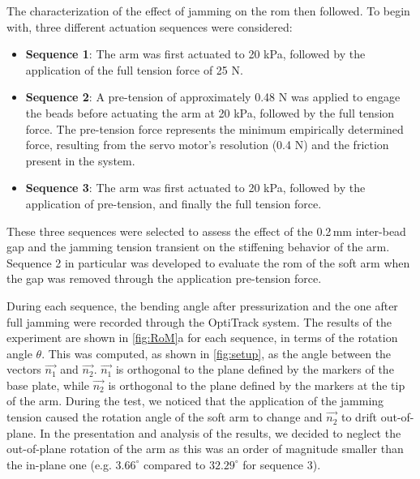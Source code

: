 The characterization of the effect of jamming on the \gls{rom} then followed.
To begin with, three different actuation sequences were considered:  
\begin{itemize}
    \item \textbf{Sequence 1}: The arm was first actuated to 20 kPa, followed by the application of the full tension force of 25 N. 
    \item \textbf{Sequence 2}: A pre-tension of approximately 0.48 N was applied to engage the beads before actuating the arm at 20 kPa, followed by the full tension force. 
    The pre-tension force represents the minimum empirically determined force, resulting from the servo motor’s resolution (0.4 N) and the friction present in the system.
    \item \textbf{Sequence 3}: The arm was first actuated to 20 kPa, followed by the application of pre-tension, and finally the full tension force.
\end{itemize}
These three sequences were selected to assess the effect of the 0.2\,mm inter-bead gap and the jamming tension transient on the stiffening behavior of the arm. Sequence 2 in particular was developed to evaluate the \gls{rom} of the soft arm when the gap was removed through the application pre-tension force.

During each sequence, the bending angle after pressurization and the one after full jamming were recorded through the OptiTrack system. The results of the experiment are shown in \cref{fig:RoM}a for each sequence, in terms of the rotation angle $\theta$. This was computed, as shown in \cref{fig:setup}, as the angle between the vectors $\overrightarrow{n_1}$ and $\overrightarrow{n_2}$. $\overrightarrow{n_1}$ is orthogonal to the plane defined by the markers of the base plate, while $\overrightarrow{n_2}$ is orthogonal to the plane defined by the markers at the tip of the arm. During the test, we noticed that the application of the jamming tension caused the rotation angle of the soft arm to change and $\overrightarrow{n_2}$ to drift out-of-plane. In the presentation and analysis of the results, we decided to neglect the out-of-plane rotation of the arm as this was an order of magnitude smaller than the in-plane one (e.g. $3.66^{\circ}$ compared to $32.29^{\circ}$ for sequence 3).

